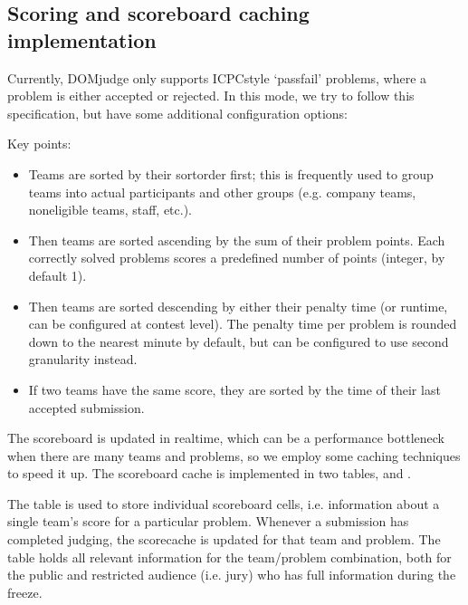\documentclass[a4paper,10pt,english,openany]{sphinxmanual}
\begin{document}
\sphinxstepscope


\subsection{Scoring and scoreboard caching implementation}
\label{\detokenize{scoring:scoring-and-scoreboard-caching-implementation}}\label{\detokenize{scoring:scoring}}\label{\detokenize{scoring::doc}}
\sphinxAtStartPar
Currently, DOMjudge only supports ICPC\sphinxhyphen{}style ‘pass\sphinxhyphen{}fail’ problems, where a problem is either accepted or rejected.
In this mode, we try to follow this specification, but have some additional configuration options:

\sphinxAtStartPar
Key points:
\begin{itemize}
\item {} 
\sphinxAtStartPar
Teams are sorted by their sortorder first; this is frequently used to group teams into actual participants and other
groups (e.g. company teams, non\sphinxhyphen{}eligible teams, staff, etc.).

\item {} 
\sphinxAtStartPar
Then teams are sorted ascending by the sum of their problem points. Each correctly solved problems scores a
pre\sphinxhyphen{}defined number of points (integer, by default 1).

\item {} 
\sphinxAtStartPar
Then teams are sorted descending by either their penalty time (or runtime, can be configured at contest level). The
penalty time per problem is rounded down to the nearest minute by default, but can be configured to use second
granularity instead.

\item {} 
\sphinxAtStartPar
If two teams have the same score, they are sorted by the time of their last accepted submission.

\end{itemize}

\sphinxAtStartPar
The scoreboard is updated in real\sphinxhyphen{}time, which can be a performance bottleneck when there are many teams and problems, so
we employ some caching techniques to speed it up. The scoreboard cache is implemented in two tables,  and
.

\sphinxAtStartPar
The  table is used to store individual scoreboard cells, i.e. information about a single team’s score for
a particular problem. Whenever a submission has completed judging, the scorecache is updated for that team and problem.
The table holds all relevant information for the team/problem combination, both for the public and restricted audience
(i.e. jury) who has full information during the freeze.
\end{document}
